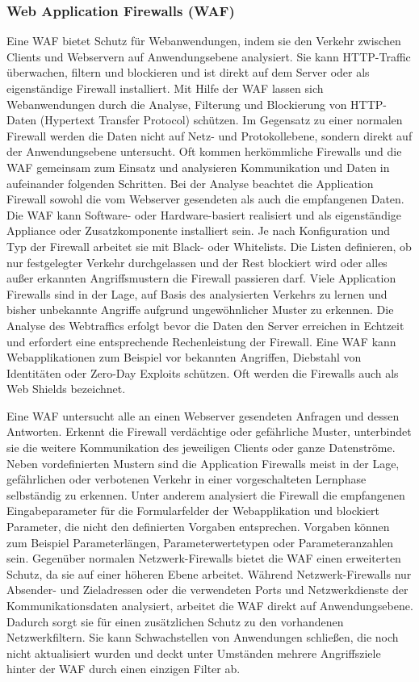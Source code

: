 \documentclass[12pt,oneside,a4paper,parskip]{scrbook}
\begin{document}
    \subsubsection{Web Application Firewalls (WAF)}
    Eine WAF bietet Schutz für Webanwendungen, indem sie den Verkehr zwischen Clients und Webservern auf Anwendungsebene analysiert. Sie kann HTTP-Traffic überwachen, filtern und blockieren und ist direkt auf dem Server oder als eigenständige Firewall installiert.
    Mit Hilfe der WAF lassen sich Webanwendungen durch die Analyse, Filterung und Blockierung von HTTP-Daten (Hypertext Transfer Protocol) schützen. Im Gegensatz zu einer normalen Firewall werden die Daten nicht auf Netz- und Protokollebene, sondern direkt auf der Anwendungsebene untersucht.
    Oft kommen herkömmliche Firewalls und die WAF gemeinsam zum Einsatz und analysieren Kommunikation und Daten in aufeinander folgenden Schritten. Bei der Analyse beachtet die Application Firewall sowohl die vom Webserver gesendeten als auch die empfangenen Daten. Die WAF kann Software- oder Hardware-basiert realisiert und als eigenständige Appliance oder Zusatzkomponente installiert sein.
    Je nach Konfiguration und Typ der Firewall arbeitet sie mit Black- oder Whitelists. Die Listen definieren, ob nur festgelegter Verkehr durchgelassen und der Rest blockiert wird oder alles außer erkannten Angriffsmustern die Firewall passieren darf. Viele Application Firewalls sind in der Lage, auf Basis des analysierten Verkehrs zu lernen und bisher unbekannte Angriffe aufgrund ungewöhnlicher Muster zu erkennen. Die Analyse des Webtraffics erfolgt bevor die Daten den Server erreichen in Echtzeit und erfordert eine entsprechende Rechenleistung der Firewall. Eine WAF kann Webapplikationen zum Beispiel vor bekannten Angriffen, Diebstahl von Identitäten oder Zero-Day Exploits schützen. Oft werden die Firewalls auch als Web Shields bezeichnet.

    Eine WAF untersucht alle an einen Webserver gesendeten Anfragen und dessen Antworten. Erkennt die Firewall verdächtige oder gefährliche Muster, unterbindet sie die weitere Kommunikation des jeweiligen Clients oder ganze Datenströme. Neben vordefinierten Mustern sind die Application Firewalls meist in der Lage, gefährlichen oder verbotenen Verkehr in einer vorgeschalteten Lernphase selbständig zu erkennen. Unter anderem analysiert die Firewall die empfangenen Eingabeparameter für die Formularfelder der Webapplikation und blockiert Parameter, die nicht den definierten Vorgaben entsprechen. Vorgaben können zum Beispiel Parameterlängen, Parameterwertetypen oder Parameteranzahlen sein. Gegenüber normalen Netzwerk-Firewalls bietet die WAF einen erweiterten Schutz, da sie auf einer höheren Ebene arbeitet. Während Netzwerk-Firewalls nur Absender- und Zieladressen oder die verwendeten Ports und Netzwerkdienste der Kommunikationsdaten analysiert, arbeitet die WAF direkt auf Anwendungsebene. Dadurch sorgt sie für einen zusätzlichen Schutz zu den vorhandenen Netzwerkfiltern. Sie kann Schwachstellen von Anwendungen schließen, die noch nicht aktualisiert wurden und deckt unter Umständen mehrere Angriffsziele hinter der WAF durch einen einzigen Filter ab.
\end{document}
